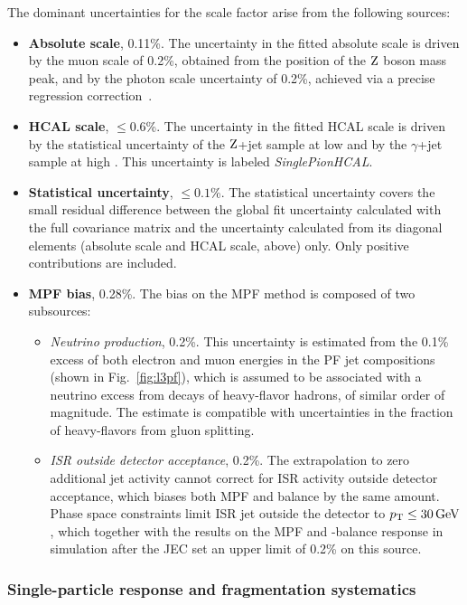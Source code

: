 \documentclass[11pt,twoside,a4paper,cmspaper,final,collab]{cms-tdr}
\begin{document}
The dominant uncertainties for the scale factor arise from the following sources:
\begin{itemize}
\item \textbf{Absolute scale}, 0.11\%. The uncertainty in the fitted absolute scale is driven by the muon scale of 0.2\%, obtained from the position of the $\mathrm{Z}$ boson mass peak, and by the photon scale uncertainty of 0.2\%, achieved via a precise regression correction~\cite{Khachatryan:2015iwa}.
\item \textbf{HCAL scale}, ${\leq} 0.6$\%. The uncertainty in the fitted HCAL scale is driven by the statistical uncertainty of the $\mathrm{Z}$+jet sample at low \pt and by the $\gamma$+jet sample at high \pt. This uncertainty is labeled \textit{SinglePionHCAL}.
\item \textbf{Statistical uncertainty}, ${\leq} 0.1$\%.
The statistical uncertainty covers the small residual difference between the global fit uncertainty calculated with the full covariance matrix and the uncertainty calculated from its diagonal elements (absolute scale and HCAL scale, above) only. Only positive contributions are included.
\item \textbf{MPF bias}, 0.28\%. The bias on the MPF method is composed of two subsources:
  \begin{itemize}
    \item \textit{Neutrino production}, 0.2\%. This uncertainty is estimated from the 0.1\% excess of both electron and muon energies in the PF jet compositions (shown in Fig.~\ref{fig:l3pf}), which is assumed to be associated with a neutrino excess from decays of heavy-flavor hadrons, of similar order of magnitude. The estimate is compatible with uncertainties in the fraction of heavy-flavors from gluon splitting.
    \item \textit{ISR outside detector acceptance}, 0.2\%. The extrapolation to zero additional jet activity cannot correct for ISR activity outside detector acceptance, which biases both MPF and \pt balance by the same amount. Phase space constraints limit ISR jet \pt outside the detector to $p_{\mathrm{T}} \leq 30\,\text{Ge\hspace{-.08em}V}$, which together with the results on the MPF and \pt-balance response in simulation after the JEC set an upper limit of 0.2\% on this source.
  \end{itemize}
\end{itemize}

\subsubsection*{Single-particle response and fragmentation systematics}
\end{document}
